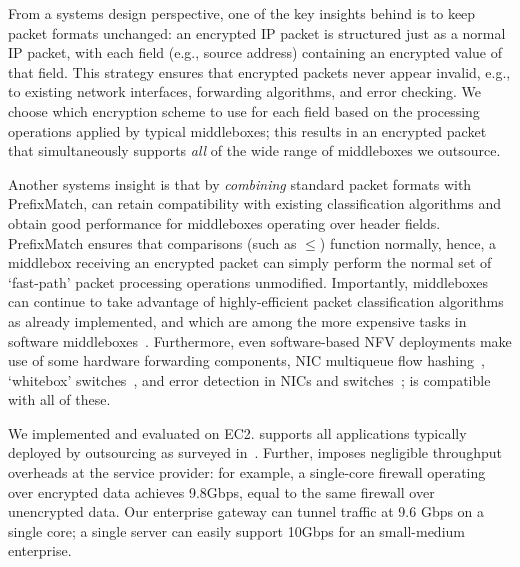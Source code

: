   From a systems design perspective, one of the key insights behind \sys is to keep packet formats unchanged: an encrypted IP packet is structured just as a normal IP packet, with each field (e.g., source address) containing an encrypted value of that field.
  This strategy ensures that encrypted packets never appear invalid, e.g., to existing network interfaces, forwarding algorithms, and error checking. 
  We choose which encryption scheme to use for each field based on the processing operations applied by typical middleboxes; this results in an encrypted packet that simultaneously supports {\it all} of the wide range of middleboxes we outsource.
  
  Another systems insight is that by {\it combining} standard packet formats with PrefixMatch, \sys can retain compatibility with existing classification algorithms and obtain good performance for middleboxes operating over header fields.
  PrefixMatch ensures that comparisons (such as $\leq$) function normally, hence, a middlebox receiving an encrypted packet can simply perform the normal set of `fast-path' packet processing operations unmodified.
  Importantly, middleboxes can continue to take advantage of highly-efficient packet classification algorithms~\cite{packet_classif} as already implemented, and which are among the more expensive tasks in software middleboxes~\cite{comb, ethan-paper}.
  Furthermore, even software-based NFV deployments make use of some hardware forwarding components, \eg{} NIC multiqueue flow hashing~\cite{nicdocument}, `whitebox' switches~\cite{whitebox}, and error detection in NICs and switches~\cite{nicdocument, ciscov6}; \sys is compatible with all of these.
  
 
We implemented and evaluated \sys on EC2. \sys supports all applications typically deployed by outsourcing as surveyed in~\cite{aplomb}.
Further, \sys imposes  negligible throughput overheads at the service provider: for example, a single-core firewall operating over encrypted data achieves 9.8Gbps, equal to the same firewall over unencrypted data.
Our enterprise gateway can tunnel traffic at 9.6 Gbps on a single core;  a single server can easily support 10Gbps for an small-medium enterprise.



